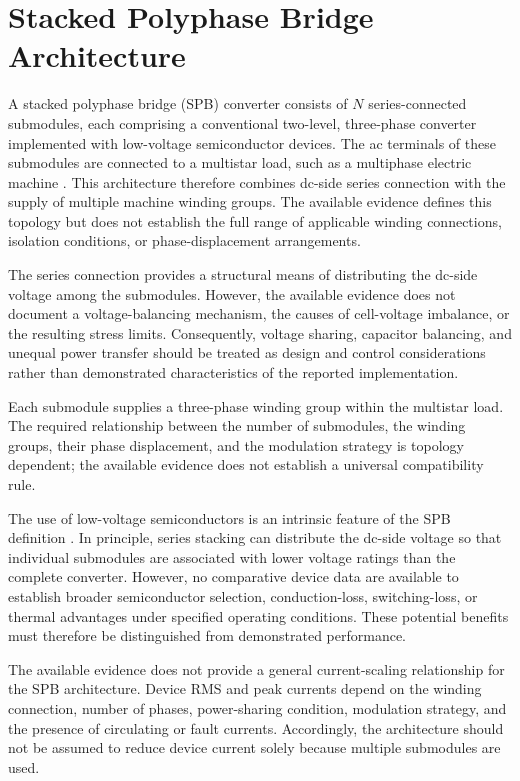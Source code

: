 \section{Stacked Polyphase Bridge Architecture}

A stacked polyphase bridge (SPB) converter consists of \(N\) series-connected submodules, each comprising a conventional two-level, three-phase converter implemented with low-voltage semiconductor devices. The ac terminals of these submodules are connected to a multistar load, such as a multiphase electric machine \cite{Jin2017}. This architecture therefore combines dc-side series connection with the supply of multiple machine winding groups. The available evidence defines this topology but does not establish the full range of applicable winding connections, isolation conditions, or phase-displacement arrangements.

The series connection provides a structural means of distributing the dc-side voltage among the submodules. However, the available evidence does not document a voltage-balancing mechanism, the causes of cell-voltage imbalance, or the resulting stress limits. Consequently, voltage sharing, capacitor balancing, and unequal power transfer should be treated as design and control considerations rather than demonstrated characteristics of the reported implementation.

Each submodule supplies a three-phase winding group within the multistar load. The required relationship between the number of submodules, the winding groups, their phase displacement, and the modulation strategy is topology dependent; the available evidence does not establish a universal compatibility rule.

The use of low-voltage semiconductors is an intrinsic feature of the SPB definition \cite{Jin2017}. In principle, series stacking can distribute the dc-side voltage so that individual submodules are associated with lower voltage ratings than the complete converter. However, no comparative device data are available to establish broader semiconductor selection, conduction-loss, switching-loss, or thermal advantages under specified operating conditions. These potential benefits must therefore be distinguished from demonstrated performance.

The available evidence does not provide a general current-scaling relationship for the SPB architecture. Device RMS and peak currents depend on the winding connection, number of phases, power-sharing condition, modulation strategy, and the presence of circulating or fault currents. Accordingly, the architecture should not be assumed to reduce device current solely because multiple submodules are used.

